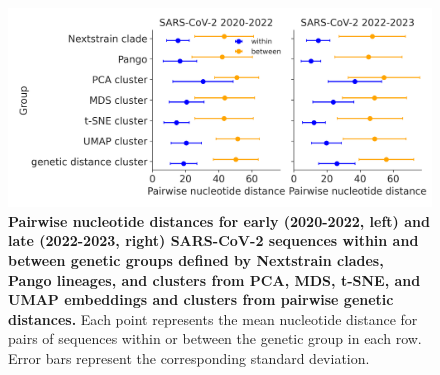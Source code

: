 \begin{figure}[!h]
\includegraphics[width=\columnwidth]{figures/within_between_sars.png}
\caption{{\bf Pairwise nucleotide distances for early (2020-2022, left) and late (2022-2023, right) SARS-CoV-2 sequences within and between genetic groups defined by Nextstrain clades, Pango lineages, and clusters from PCA, MDS, t-SNE, and UMAP embeddings and clusters from pairwise genetic distances.}
  Each point represents the mean nucleotide distance for pairs of sequences within or between the genetic group in each row.
  Error bars represent the corresponding standard deviation.}\label{S_Fig_sarscov2_within_between_group_distances}
\end{figure}

